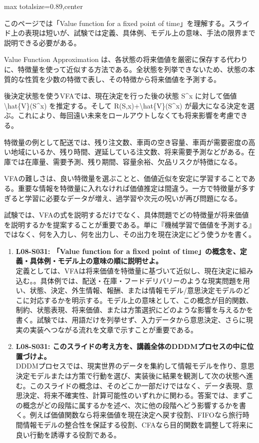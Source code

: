 \begin{minipage}[t]{0.58\textwidth}
\begin{adjustbox}{max totalsize={\textwidth}{0.89\textheight},center}
\begin{minipage}{\textwidth}\scriptsize
{}このページでは「Value function for a fixed point of time」を理解する。スライド上の表現は短いが、試験では定義、具体例、モデル上の意味、手法の限界まで説明できる必要がある。\par
Value Function Approximation は、各状態の将来価値を厳密に保存する代わりに、特徴量を使って近似する方法である。全状態を列挙できないため、状態の本質的な性質を少数の特徴で表し、その特徴から将来価値を予測する。\par
後決定状態を使うVFAでは、現在決定を行った後の状態 S\textasciicircum{}x に対して価値 \textbackslash{}hat\{V\}(S\textasciicircum{}x) を推定する。そして R(S,x)+\textbackslash{}hat\{V\}(S\textasciicircum{}x) が最大になる決定を選ぶ。これにより、毎回遠い未来をロールアウトしなくても将来影響を考慮できる。\par
特徴量の例として配送では、残り注文数、車両の空き容量、車両が需要密度の高い地域にいるか、残り時間、遅延している注文数、将来需要予測などがある。在庫では在庫量、需要予測、残り期間、容量余裕、欠品リスクが特徴になる。\par
VFAの難しさは、良い特徴量を選ぶことと、価値近似を安定に学習することである。重要な情報を特徴量に入れなければ価値推定は間違う。一方で特徴量が多すぎると学習に必要なデータが増え、過学習や次元の呪いが再び問題になる。\par
試験では、VFAの式を説明するだけでなく、具体問題でどの特徴量が将来価値を説明するかを提案することが重要である。単に『機械学習で価値を予測する』ではなく、何を入力し、何を出力し、その出力を現在決定にどう使うかを書く。\par{}\begin{enumerate}\item \textbf{L08-S031: 「Value function for a fixed point of time」の概念を、定義・具体例・モデル上の意味の順に説明せよ。}\\定義としては、VFAは将来価値を特徴量に基づいて近似し、現在決定に組み込む。。具体例では、配送・在庫・フードデリバリーのような現実問題を用い、状態、決定、外生情報、報酬、または情報モデル/意思決定モデルのどこに対応するかを明示する。モデル上の意味として、この概念が目的関数、制約、状態表現、将来価値、または方策選択にどのような影響を与えるかを書く。試験では、用語だけを列挙せず、入力データから意思決定、さらに現実の実装へつながる流れを文章で示すことが重要である。\item \textbf{L08-S031: このスライドの考え方を、講義全体のDDDMプロセスの中に位置づけよ。}\\DDDMプロセスでは、現実世界のデータを集約して情報モデルを作り、意思決定モデルまたは方策で行動を選び、実装後に結果を観測して次の状態へ進む。このスライドの概念は、そのどこか一部だけではなく、データ表現、意思決定、将来不確実性、計算可能性のいずれかに関わる。答案では、まずこの概念がどの段階に属するかを述べ、次に他の段階へどう影響するかを書く。例えば価値関数なら将来価値を現在決定へ戻す役割、FIFOなら旅行時間情報モデルの整合性を保証する役割、CFAなら目的関数を調整して将来に良い行動を誘導する役割である。\end{enumerate}

\end{minipage}
\end{adjustbox}
\end{minipage}
